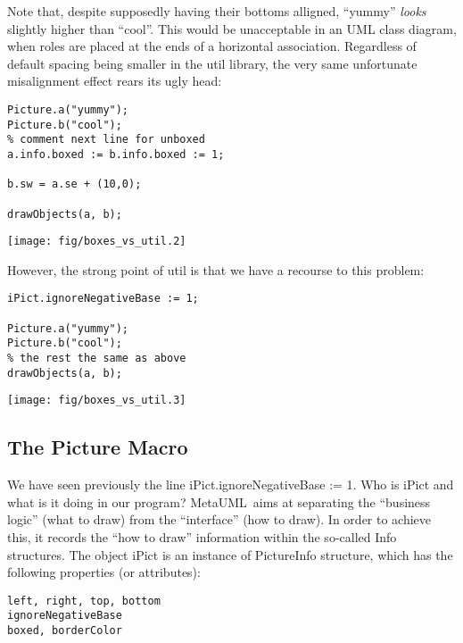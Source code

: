 \documentclass{article}
\newcommand{\code}{\ttfamily}
\newcommand{\metauml}{MetaUML}
\begin{document}
Note that, despite supposedly having their bottoms alligned,
``yummy'' {\it looks} slightly higher than ``cool''. This would be unacceptable
in an UML class diagram, when roles are placed at the ends of a horizontal association.
Regardless of default spacing being smaller in the {\code util} library,
the very same unfortunate misalignment effect rears its ugly head:

\pagebreak

\begin{multicols}{2}
\begin{verbatim}
Picture.a("yummy");
Picture.b("cool");
% comment next line for unboxed
a.info.boxed := b.info.boxed := 1;

b.sw = a.se + (10,0);

drawObjects(a, b);
\end{verbatim}
\columnbreak
\hspace{1cm}\texttt{[image: fig/boxes\_vs\_util.2]}
\end{multicols}

However, the strong point of {\code util} is that we have a recourse to this problem:

\begin{multicols}{2}
\begin{verbatim}
iPict.ignoreNegativeBase := 1;

Picture.a("yummy");
Picture.b("cool");
% the rest the same as above
drawObjects(a, b);
\end{verbatim}
\columnbreak
\hspace{1cm}\texttt{[image: fig/boxes\_vs\_util.3]}
\end{multicols}

\subsection{The Picture Macro}

We have seen previously the line {\code iPict.ignoreNegativeBase := 1}.
Who is {\code iPict} and what is it doing in our program? \metauml\
aims at separating the ``business logic'' (what to draw) from the
``interface'' (how to draw). In order to achieve this, it records the ``how to draw''
information within the so-called {\code Info} structures. The object {\code iPict}
is an instance of {\code PictureInfo} structure, which has the following properties
(or attributes):
\begin{verbatim}
left, right, top, bottom
ignoreNegativeBase
boxed, borderColor
\end{verbatim}
\end{document}
